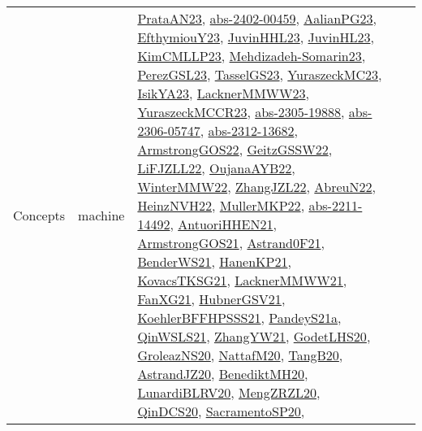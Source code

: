 {\begin{longtable}{lp{3cm}>{\raggedright}p{6cm}>{\raggedright}p{6cm}p{8cm}}
Concepts & machine & \href{articles/PrataAN23.pdf}{PrataAN23}\cite{PrataAN23}, \href{articles/abs-2402-00459.pdf}{abs-2402-00459}\cite{abs-2402-00459}, \href{papers/AalianPG23.pdf}{AalianPG23}\cite{AalianPG23}, \href{papers/EfthymiouY23.pdf}{EfthymiouY23}\cite{EfthymiouY23}, \href{papers/JuvinHHL23.pdf}{JuvinHHL23}\cite{JuvinHHL23}, \href{papers/JuvinHL23.pdf}{JuvinHL23}\cite{JuvinHL23}, \href{papers/KimCMLLP23.pdf}{KimCMLLP23}\cite{KimCMLLP23}, \href{papers/Mehdizadeh-Somarin23.pdf}{Mehdizadeh-Somarin23}\cite{Mehdizadeh-Somarin23}, \href{papers/PerezGSL23.pdf}{PerezGSL23}\cite{PerezGSL23}, \href{papers/TasselGS23.pdf}{TasselGS23}\cite{TasselGS23}, \href{papers/YuraszeckMC23.pdf}{YuraszeckMC23}\cite{YuraszeckMC23}, \href{articles/IsikYA23.pdf}{IsikYA23}\cite{IsikYA23}, \href{articles/LacknerMMWW23.pdf}{LacknerMMWW23}\cite{LacknerMMWW23}, \href{articles/YuraszeckMCCR23.pdf}{YuraszeckMCCR23}\cite{YuraszeckMCCR23}, \href{articles/abs-2305-19888.pdf}{abs-2305-19888}\cite{abs-2305-19888}, \href{articles/abs-2306-05747.pdf}{abs-2306-05747}\cite{abs-2306-05747}, \href{articles/abs-2312-13682.pdf}{abs-2312-13682}\cite{abs-2312-13682}, \href{papers/ArmstrongGOS22.pdf}{ArmstrongGOS22}\cite{ArmstrongGOS22}, \href{papers/GeitzGSSW22.pdf}{GeitzGSSW22}\cite{GeitzGSSW22}, \href{papers/LiFJZLL22.pdf}{LiFJZLL22}\cite{LiFJZLL22}, \href{papers/OujanaAYB22.pdf}{OujanaAYB22}\cite{OujanaAYB22}, \href{papers/WinterMMW22.pdf}{WinterMMW22}\cite{WinterMMW22}, \href{papers/ZhangJZL22.pdf}{ZhangJZL22}\cite{ZhangJZL22}, \href{articles/AbreuN22.pdf}{AbreuN22}\cite{AbreuN22}, \href{articles/HeinzNVH22.pdf}{HeinzNVH22}\cite{HeinzNVH22}, \href{articles/MullerMKP22.pdf}{MullerMKP22}\cite{MullerMKP22}, \href{articles/abs-2211-14492.pdf}{abs-2211-14492}\cite{abs-2211-14492}, \href{papers/AntuoriHHEN21.pdf}{AntuoriHHEN21}\cite{AntuoriHHEN21}, \href{papers/ArmstrongGOS21.pdf}{ArmstrongGOS21}\cite{ArmstrongGOS21}, \href{papers/Astrand0F21.pdf}{Astrand0F21}\cite{Astrand0F21}, \href{papers/BenderWS21.pdf}{BenderWS21}\cite{BenderWS21}, \href{papers/HanenKP21.pdf}{HanenKP21}\cite{HanenKP21}, \href{papers/KovacsTKSG21.pdf}{KovacsTKSG21}\cite{KovacsTKSG21}, \href{papers/LacknerMMWW21.pdf}{LacknerMMWW21}\cite{LacknerMMWW21}, \href{articles/FanXG21.pdf}{FanXG21}\cite{FanXG21}, \href{articles/HubnerGSV21.pdf}{HubnerGSV21}\cite{HubnerGSV21}, \href{articles/KoehlerBFFHPSSS21.pdf}{KoehlerBFFHPSSS21}\cite{KoehlerBFFHPSSS21}, \href{articles/PandeyS21a.pdf}{PandeyS21a}\cite{PandeyS21a}, \href{articles/QinWSLS21.pdf}{QinWSLS21}\cite{QinWSLS21}, \href{articles/ZhangYW21.pdf}{ZhangYW21}\cite{ZhangYW21}, \href{papers/GodetLHS20.pdf}{GodetLHS20}\cite{GodetLHS20}, \href{papers/GroleazNS20.pdf}{GroleazNS20}\cite{GroleazNS20}, \href{papers/NattafM20.pdf}{NattafM20}\cite{NattafM20}, \href{papers/TangB20.pdf}{TangB20}\cite{TangB20}, \href{articles/AstrandJZ20.pdf}{AstrandJZ20}\cite{AstrandJZ20}, \href{articles/BenediktMH20.pdf}{BenediktMH20}\cite{BenediktMH20}, \href{articles/LunardiBLRV20.pdf}{LunardiBLRV20}\cite{LunardiBLRV20}, \href{articles/MengZRZL20.pdf}{MengZRZL20}\cite{MengZRZL20}, \href{articles/QinDCS20.pdf}{QinDCS20}\cite{QinDCS20}, \href{articles/SacramentoSP20.pdf}{SacramentoSP20}\cite{SacramentoSP20}, 
\end{longtable}}
